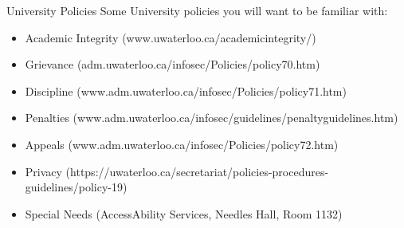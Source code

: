 \documentclass{beamer}
\begin{document}
	\begin{frame}{University Policies}
		Some University policies you will want to be familiar with:
		\vspace{1em}
		\begin{itemize}
			\setlength\itemsep{0.75em}
			\item \normalsize{Academic Integrity} \tiny{(www.uwaterloo.ca/academicintegrity/)}
			\item \normalsize{Grievance} \tiny{(adm.uwaterloo.ca/infosec/Policies/policy70.htm)}
			\item \normalsize{Discipline} \tiny{(www.adm.uwaterloo.ca/infosec/Policies/policy71.htm)}
			\item \normalsize{Penalties} \tiny{(www.adm.uwaterloo.ca/infosec/guidelines/penaltyguidelines.htm)}
			\item \normalsize{Appeals} \tiny{(www.adm.uwaterloo.ca/infosec/Policies/policy72.htm)}
			\item \normalsize{Privacy} \tiny{(https://uwaterloo.ca/secretariat/policies-procedures-guidelines/policy-19)}
			\item \normalsize{Special Needs} \tiny{(AccessAbility Services, Needles Hall, Room 1132)}
		\end{itemize}
	\end{frame}  
\end{document}
